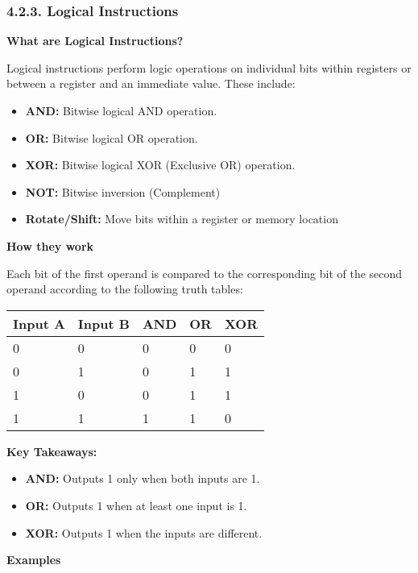 \documentclass[
]{article}
\begin{document}
\hypertarget{423-logical-instructions}{%
\subsubsection{4.2.3. Logical
Instructions}\label{423-logical-instructions}}

\textbf{What are Logical Instructions?}

Logical instructions perform logic operations on individual bits within
registers or between a register and an immediate value. These include:

\begin{itemize}
\item
  \textbf{AND:} Bitwise logical AND operation.
\item
  \textbf{OR:} Bitwise logical OR operation.
\item
  \textbf{XOR:} Bitwise logical XOR (Exclusive OR) operation.
\item
  \textbf{NOT:} Bitwise inversion (Complement)
\item
  \textbf{Rotate/Shift:} Move bits within a register or memory location
\end{itemize}

\textbf{How they work}

Each bit of the first operand is compared to the corresponding bit of
the second operand according to the following truth tables:

\begin{longtable}[]{@{}lllll@{}}
\toprule
Input A & Input B & AND & OR & XOR \\
\midrule
\endhead
0 & 0 & 0 & 0 & 0 \\
0 & 1 & 0 & 1 & 1 \\
1 & 0 & 0 & 1 & 1 \\
1 & 1 & 1 & 1 & 0 \\
\bottomrule
\end{longtable}

\textbf{Key Takeaways:}

\begin{itemize}
\item
  \textbf{AND:} Outputs 1 only when both inputs are 1.
\item
  \textbf{OR:} Outputs 1 when at least one input is 1.
\item
  \textbf{XOR:} Outputs 1 when the inputs are different.
\end{itemize}

\textbf{Examples}
\end{document}
